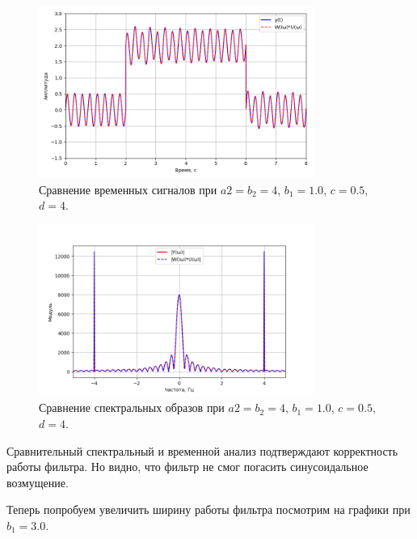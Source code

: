 \documentclass[a4paper]{article}
\begin{document}
\begin{figure}[H]
  \centering
  \includegraphics[width=0.8\textwidth]{src/task_1_2/2. time_comp_157_1_0.5.png}
  \caption{Сравнение временных сигналов при $a2 = b_2 = 4$, $b_1=1.0$, $c=0.5$, $d=4$.}
\end{figure}

\begin{figure}[H]
  \centering
  \includegraphics[width=0.8\textwidth]{src/task_1_2/2. spec_comp_157_1_0.5.png}
  \caption{Сравнение спектральных образов при $a2 = b_2 = 4$, $b_1=1.0$, $c=0.5$, $d=4$.}
\end{figure}
\noindent Сравнительный спектральный и временной анализ подтверждают корректность работы фильтра. Но видно, что фильтр не смог погасить синусоидальное возмущение.

Теперь попробуем увеличить ширину работы фильтра посмотрим на графики при $b_1 = 3.0$.  
\end{document}
